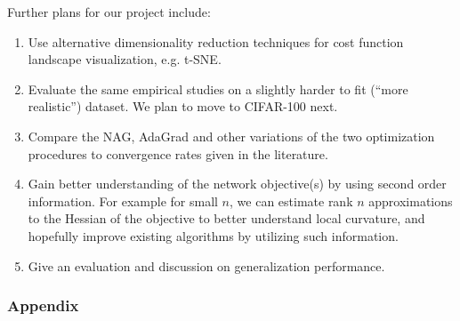 \documentclass[12pt,english]{article}
\newcommand{\1}{\mathbb{I}} %
\begin{document}
Further plans for our project include:

\begin{enumerate}

\item Use alternative dimensionality reduction techniques for cost function
landscape visualization, e.g. t-SNE.

\item Evaluate the same empirical studies on a slightly harder to fit (``more realistic'') dataset.
We plan to move to CIFAR-100 next.

\item Compare the NAG, AdaGrad and other variations of the two optimization
procedures to convergence rates given in the literature.

\item Gain better understanding of the network objective(s) by using second
order information.  For example for small $n$, we can estimate rank $n$
approximations to the Hessian of the objective to better understand local
curvature, and hopefully improve existing algorithms by utilizing
such information.

\item Give an evaluation and discussion on generalization performance.

\end{enumerate}

\newpage
\subsubsection*{Appendix}
\end{document}
